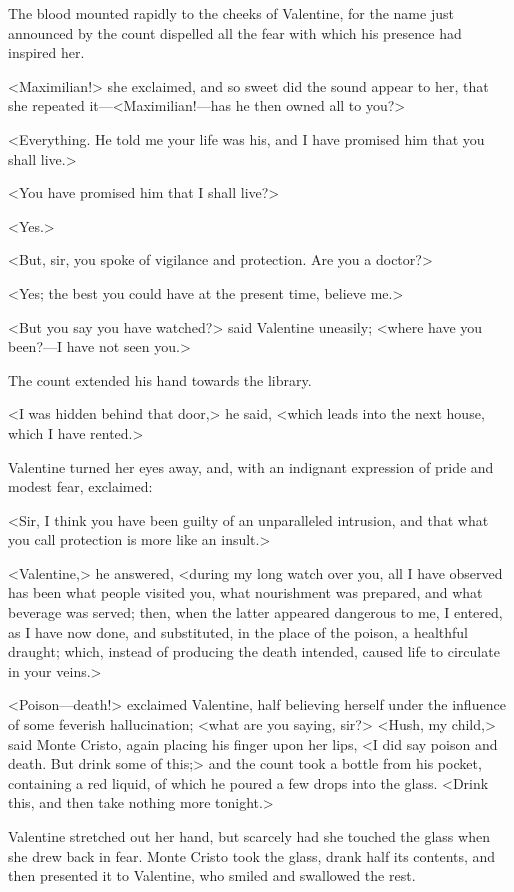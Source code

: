  The blood mounted rapidly to the cheeks of Valentine, for the name just announced by the count dispelled all the fear with which his presence had inspired her. 

 <Maximilian!> she exclaimed, and so sweet did the sound appear to her, that she repeated it—<Maximilian!—has he then owned all to you?> 

 <Everything. He told me your life was his, and I have promised him that you shall live.> 

 <You have promised him that I shall live?> 

 <Yes.> 

 <But, sir, you spoke of vigilance and protection. Are you a doctor?> 

 <Yes; the best you could have at the present time, believe me.> 

 <But you say you have watched?> said Valentine uneasily; <where have you been?—I have not seen you.> 

 The count extended his hand towards the library. 

 <I was hidden behind that door,> he said, <which leads into the next house, which I have rented.> 

 Valentine turned her eyes away, and, with an indignant expression of pride and modest fear, exclaimed: 

 <Sir, I think you have been guilty of an unparalleled intrusion, and that what you call protection is more like an insult.> 

 <Valentine,> he answered, <during my long watch over you, all I have observed has been what people visited you, what nourishment was prepared, and what beverage was served; then, when the latter appeared dangerous to me, I entered, as I have now done, and substituted, in the place of the poison, a healthful draught; which, instead of producing the death intended, caused life to circulate in your veins.> 

 <Poison—death!> exclaimed Valentine, half believing herself under the influence of some feverish hallucination; <what are you saying, sir?>  <Hush, my child,> said Monte Cristo, again placing his finger upon her lips, <I did say poison and death. But drink some of this;> and the count took a bottle from his pocket, containing a red liquid, of which he poured a few drops into the glass. <Drink this, and then take nothing more tonight.> 

 Valentine stretched out her hand, but scarcely had she touched the glass when she drew back in fear. Monte Cristo took the glass, drank half its contents, and then presented it to Valentine, who smiled and swallowed the rest. 


